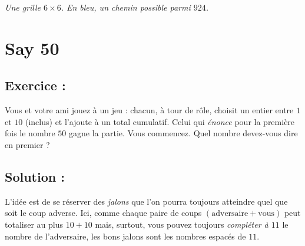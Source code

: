 \begin{center}

\smallskip
\emph{Une grille \(6\times6\). En bleu, un chemin possible parmi \(924\).}
\end{center}



\section{Say 50}

\subsection*{Exercice :}

\begin{exerciseBox}[Say 50]
Vous et votre ami jouez à un jeu : chacun, à tour de rôle, choisit un entier
entre \(1\) et \(10\) (inclus) et l'ajoute à un total cumulatif.
Celui qui \emph{énonce} pour la première fois le nombre \(50\) gagne la partie.
Vous commencez. Quel nombre devez-vous dire en premier ?    
\end{exerciseBox}


\subsection*{Solution :}

L'idée est de se réserver des \emph{jalons} que l'on pourra toujours atteindre
quel que soit le coup adverse. Ici, comme chaque paire de coups
\((\text{adversaire} + \text{vous})\) peut totaliser au plus \(10+10\) mais,
surtout, vous pouvez toujours \emph{compléter à \(11\)} le nombre de l'adversaire,
les bons jalons sont les nombres espacés de \(11\).

